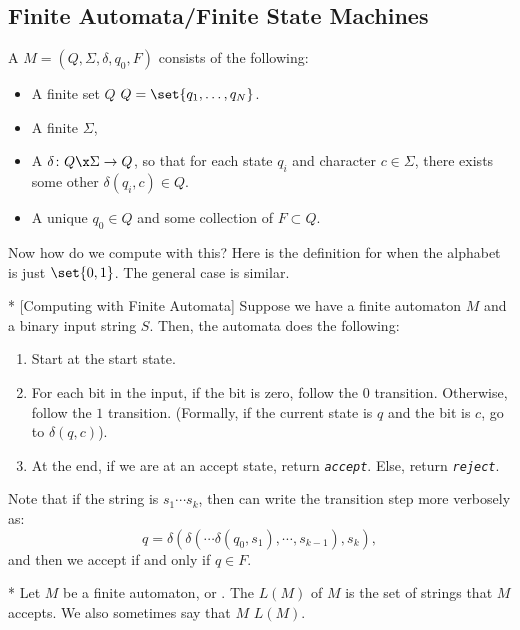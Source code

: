 \subsection{Finite Automata/Finite State Machines}

\begin{defn}
	A  $M = (Q, \Sigma, \delta, q_0, F)$ consists of the following:
	\begin{itemize}
		\item A finite set $Q$  $Q = \set{q_1, \ldots, q_N}$.
		\item A finite  $\Sigma$,
		\item A  $\delta \colon Q\x \Sigma \to Q$, so that for each state $q_i$ and character $c\in \Sigma$, there exists some other $\delta(q_i, c)\in Q$.
		\item A unique  $q_0 \in Q$ and some collection of  $F\subset Q$.
	\end{itemize}
\end{defn}

Now how do we compute with this? Here is the definition for when the alphabet is just $\set{0,1}$. The general case is similar.

\begin{defn}*
	[Computing with Finite Automata]
	Suppose we have a finite automaton $M$ and a binary input string $S$. Then, the automata does the following:
	\begin{enumerate}
		\item Start at the start state.
		\item For each bit in the input, if the bit is zero, follow the $0$ transition. Otherwise, follow the $1$ transition. (Formally, if the current state is $q$ and the bit is $c$, go to $\delta(q,c)$).
		\item At the end, if we are at an accept state, return \emph{\texttt{accept}}. Else, return \emph{\texttt{reject}}.
	\end{enumerate}
\end{defn}

Note that if the string is $s_1 \cdots s_k$, then can write the transition step  more verbosely as: \[
	q = \delta(\delta(\cdots \delta(q_0, s_1),\cdots, s_{k-1}), s_k),
\]
and then we accept if and only if $q\in F$.

\begin{defn}*
	Let $M$ be a finite automaton, or . 
	The  $L(M)$ of $M$ is the set of strings that $M$ accepts. 
	We also sometimes say that $M$  $L(M)$. 
\end{defn}

